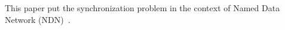 \documentclass{sigchi}
\begin{document}
This paper put the synchronization problem in the context of Named Data Network (NDN)~\cite{Jndn}. 




\end{document}
